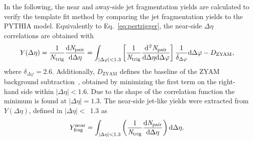 \begin{table}[!b]
\caption{The scale factor $F$ for various multiplicity intervals is shown for pp collisions (top) and p--Pb collisions (bottom), with 1~$<\it{p}{\rm{T,trig}}<$~2~GeV/$c$ and 1~$<\it{p}{\rm{T,assoc}}<$~4~GeV/$c$. Note that only statistical uncertainties are reported in the table. The systematic uncertainty for $F$ is 3.8\%, which is the same for both collision systems and multiplicity intervals.}
\centering
{}
\label{tab:FpppPb}
\end{table}

In the following, the near and away-side jet fragmentation yields are calculated to verify the template fit method by comparing the jet fragmentation yields to the PYTHIA model. Equivalently to Eq.~\eqref{eq:pertrigger}, the near-side $\Delta\eta$ correlations are obtained with
\begin{equation}
Y(\Delta\eta)=\frac{1}{N_{\rm{trig}}} \frac{ \rm{d}\it{}N_{\rm{pair}} }{ \rm{d}\Delta\eta }=\int_{|\Delta\varphi|<1.3}\left[ \frac{1}{\it{N}_{\rm{trig}}} \frac{ \rm{d}\it{}^{2} N_{\rm{pair}} }{ \rm{d}\Delta\eta d\Delta\varphi} \right]\dfrac{1}{\delta_{\Delta\varphi}} {\rm{d}}\Delta \varphi - D_\mathrm{ZYAM},
\label{eq:deltaetacorr}
\end{equation}
where $\delta_{\Delta\varphi}=2.6$. Additionally, $D_\mathrm{ZYAM}$ defines the baseline of the ZYAM background subtraction~\cite{Ajitanand:2005jj}, obtained by minimizing the first term on the right-hand side within $|\Delta\eta|<1.6$. Due to the shape of the correlation function the minimum is found at $|\Delta\eta|=1.3$.
The near-side jet-like yields were extracted from $Y(\Delta\eta)$, defined in $|\Delta\eta|<$~1.3 as
\begin{eqnarray}
Y^\mathrm{near}_{\rm{frag}} = \int_{|\Delta \eta|<1.3} \left( \frac{1}{\it{N}_{\rm{trig}}} \frac{ \rm{d}\it{}N_{\rm{pair}} }{ \rm{d}\Delta\eta } \right) \rm{d} \Delta\eta.
\label{eq:Ynear}
\end{eqnarray}

